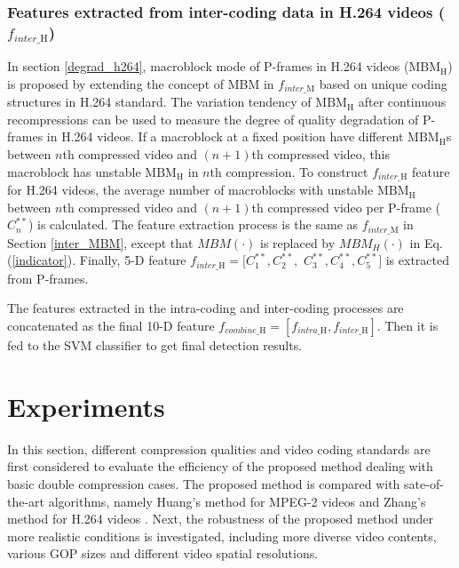 \documentclass[journal,sort]{IEEEtran}
\begin{document}
\subsubsection{Features extracted from inter-coding data in H.264 videos ($f_{inter\_\text{H}}$) \label{h264-mbmh}}
In section \ref{degrad_h264}, macroblock mode of P-frames in H.264 videos ($\text{MBM}_\text{H}$) is proposed by extending the concept of MBM in $f_{inter\_\text{M}}$ based on unique coding structures in H.264 standard. The variation tendency of $\text{MBM}_\text{H}$ after continuous recompressions can be used to measure the degree of quality degradation of P-frames in H.264 videos. If a macroblock at a fixed position have different $\text{MBM}_\text{H}$s between $n$th compressed video and $(n+1)$th compressed video, this macroblock has unstable $\text{MBM}_\text{H}$ in $n$th compression. To construct $f_{inter\_\text{H}}$ feature for H.264 videos, the average number of macroblocks with unstable $\text{MBM}_\text{H}$ between $n$th compressed video and $(n+1)$th compressed video per P-frame ($C^{**}_n$) is calculated. The feature extraction process is the same as $f_{inter\_\text{M}}$ in Section \ref{inter_MBM}, except that $MBM(\cdot)$ is replaced by $MBM_H(\cdot)$ in Eq. (\ref{indicator}). Finally, 5-D feature $f_{inter\_\text{H}}=[C^{**}_1,C^{**}_2,$ $C^{**}_3,C^{**}_4,C^{**}_5]$ is extracted from P-frames. 

The features extracted in the intra-coding and inter-coding processes are concatenated as the final 10-D feature $f_{combine\_\text{H}}=[f_{intra\_\text{H}},f_{inter\_\text{H}}]$. Then it is fed to the SVM classifier to get final detection results.



\section{Experiments}

In this section, different compression qualities and video coding standards are first considered to evaluate the efficiency of the proposed method dealing with basic double compression cases. The proposed method is compared with sate-of-the-art algorithms, namely Huang's method for MPEG-2 videos \cite{huang2014detection} and Zhang's method for H.264 videos \cite{zhang2016detecting}. Next, the robustness of the proposed method under more realistic conditions is investigated, including more diverse video contents, various GOP sizes and different video spatial resolutions.
\end{document}
